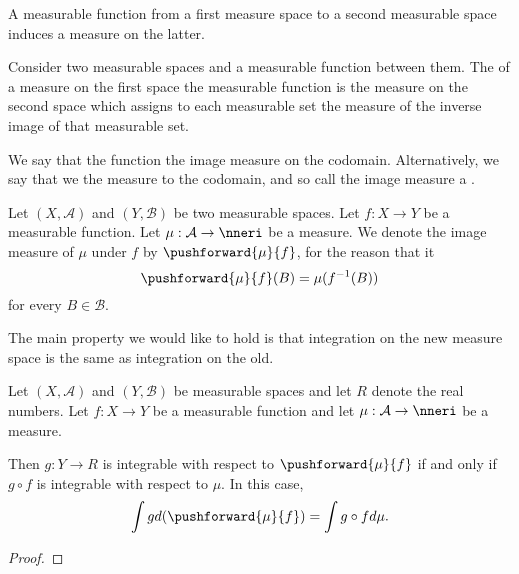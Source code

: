 


A measurable
function from
a first measure space
to a second measurable space
induces a measure
on the latter.


Consider two measurable
spaces and a measurable
function between them.
The
of a measure on the first space
the measurable function
is the measure on the second space
which assigns to each measurable set
the measure of the inverse image of
that measurable set.

We say that the
function
the image measure
on the
codomain.
Alternatively,
we say that we
the measure to the
codomain, and so
call the image
measure
a
.


Let
$(X, \mathcal{A})$
and
$(Y, \mathcal{B})$
be two measurable spaces.
Let $f: X \to Y$ be
a measurable function.
Let
$\mu: \mathcal{A} \to \nneri$
be a measure.
We denote the
image measure of $\mu$
under $f$ by
$\pushforward{\mu}{f}$,
for the reason that it
\[
  \pushforward{\mu}{f}(B) = \mu(f^{-1}(B))
\]
for every $B \in \mathcal{B}$.


The main property
we would like to hold
is that integration
on the new measure space
is the same as integration
on the old.

\begin{prop}
  Let
  $(X, \mathcal{A})$
  and
  $(Y, \mathcal{B})$
  be measurable spaces
  and let $R$ denote
  the real numbers.
  Let $f: X \to Y$ be
  a measurable function
  and let
  $\mu: \mathcal{A} \to \nneri$
  be a measure.

  Then $g: Y \to R$
  is integrable with
  respect to
  $\pushforward{\mu}{f}$
  if and only if
  $g \circ f$
  is integrable with
  respect to
  $\mu$.
  In this case,
  \[
    \int g d(\pushforward{\mu}{f})
    =
    \int g \circ f d\mu.
  \]
  \begin{proof}
  \end{proof}
\end{prop}
